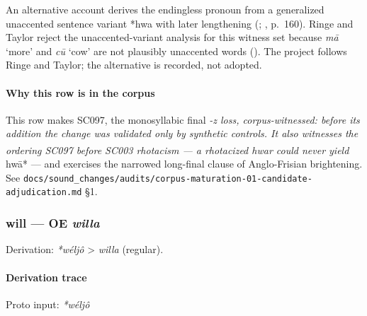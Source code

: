 \documentclass[
  british,
  a4paper,
]{article}
\providecommand{\Pred}[1]{\textsuperscript{\dag}\emph{#1}}
\begin{document}
An alternative account derives the endingless pronoun from a generalized
unaccented sentence variant *hwa with later lengthening
(;
, p.~160).
Ringe and Taylor reject the unaccented-variant analysis for this witness
set because \emph{mā} `more' and \emph{cū} `cow' are not plausibly
unaccented words (). The project follows Ringe and Taylor; the alternative is recorded,
not adopted.

\paragraph{Why this row is in the
corpus}\label{why-this-row-is-in-the-corpus-2}

This row makes SC097, the monosyllabic final \emph{-z loss,
corpus-witnessed: before its addition the change was validated only by
synthetic controls. It also witnesses the ordering SC097 before SC003
rhotacism --- a rhotacized \Pred{hwar} could never yield }hwā* --- and
exercises the narrowed long-final clause of Anglo-Frisian brightening.
See
\texttt{docs/sound\_changes/audits/corpus-maturation-01-candidate-adjudication.md}
§1.

\subsubsection{\texorpdfstring{will --- OE
\emph{willa}}{will --- OE willa}}\label{will-oe-willa}

Derivation: \emph{*wéljô} \textgreater{} \emph{willa} (regular).

\paragraph{Derivation trace}\label{derivation-trace-99}

Proto input: \emph{*wéljô}

\begingroup
\setlength{\fboxsep}{6pt}
\end{document}
